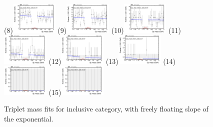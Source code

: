 \begin{figure}[h!]
        \subfigure(8){\includegraphics[width=0.2\textwidth]{power_law/plots/all/massfit_all_40bins_bdtcut0.51.png}}
        \subfigure(9){\includegraphics[width=0.2\textwidth]{power_law/plots/all/massfit_all_40bins_bdtcut0.55.png}}
        \subfigure(10){\includegraphics[width=0.2\textwidth]{power_law/plots/all/massfit_all_40bins_bdtcut0.59.png}}
        \subfigure(11){\includegraphics[width=0.2\textwidth]{power_law/plots/all/massfit_all_40bins_bdtcut0.63.png}}
        \subfigure(12){\includegraphics[width=0.2\textwidth]{power_law/plots/all/massfit_all_40bins_bdtcut0.67.png}}
        \subfigure(13){\includegraphics[width=0.2\textwidth]{power_law/plots/all/massfit_all_40bins_bdtcut0.7.png}}
        \subfigure(14){\includegraphics[width=0.2\textwidth]{power_law/plots/all/massfit_all_40bins_bdtcut0.76.png}}
        \subfigure(15){\includegraphics[width=0.2\textwidth]{power_law/plots/all/massfit_all_40bins_bdtcut0.82.png}}
        \caption{Triplet mass fits for inclusive category, with freely floating slope of the exponential.}
        \label{fig:unfixed_all}
\end{figure}

